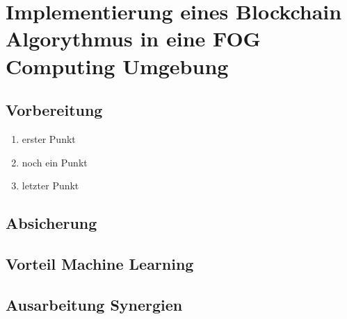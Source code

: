 \chapter[Implementierung]{Implementierung eines Blockchain Algorythmus in eine FOG Computing Umgebung}
\section{Vorbereitung}

\begin{enumerate}
 \item erster Punkt
 \item noch ein Punkt
 \item letzter Punkt
\end{enumerate}


\section{Absicherung}

\section{Vorteil Machine Learning}

\section{Ausarbeitung Synergien}